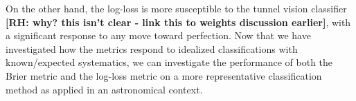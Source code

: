 On the other hand, the log-loss is more susceptible to the tunnel vision classifier \textbf{[RH: why? this isn't clear - link this to weights discussion earlier]}, with a significant response to any move toward perfection.
Now that we have investigated how the metrics respond to idealized classifications with known/expected systematics, we can investigate the performance of both the Brier metric and the log-loss metric on a more representative classification method as applied in an astronomical context.



